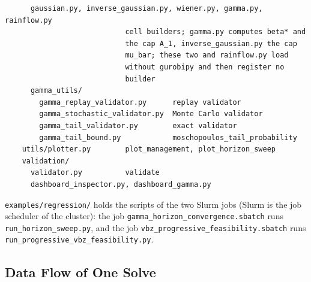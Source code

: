 \begin{lstlisting}
      gaussian.py, inverse_gaussian.py, wiener.py, gamma.py, rainflow.py
                            cell builders; gamma.py computes beta* and
                            the cap A_1, inverse_gaussian.py the cap
                            mu_bar; these two and rainflow.py load
                            without gurobipy and then register no
                            builder
      gamma_utils/
        gamma_replay_validator.py      replay validator
        gamma_stochastic_validator.py  Monte Carlo validator
        gamma_tail_validator.py        exact validator
        gamma_tail_bound.py            moschopoulos_tail_probability
    utils/plotter.py        plot_management, plot_horizon_sweep
    validation/
      validator.py          validate
      dashboard_inspector.py, dashboard_gamma.py
\end{lstlisting}
\texttt{examples/regression/} holds the scripts of the two Slurm jobs (Slurm is the job scheduler of the cluster): the job \texttt{gamma\_horizon\_convergence.sbatch} runs \texttt{run\_horizon\_sweep.py}, and the job \texttt{vbz\_progressive\_feasibility.sbatch} runs \texttt{run\_progressive\_vbz\_feasibility.py}.

\subsection{Data Flow of One Solve}
\label{sec:data_flow}

